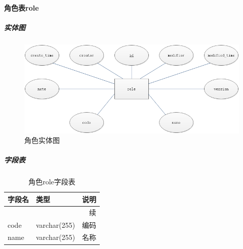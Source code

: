 \documentclass[titlepage,UTF8,linespread=1.5]{ctexart}
\begin{document}
\paragraph{角色表role}
\subparagraph{实体图}
\begin{figure}[H]
    \centering
    \includegraphics[width=140mm]{entity-role.png}
    \caption{角色实体图}
    \label{fig:entity-role}
\end{figure}
\subparagraph{字段表}
\begin{longtable}{|p{10em}|p{6em}|p{15em}|}
    \caption{角色role字段表}\label{tab:table_role}       \\\hline
    字段名         & 类型         & 说明                 \\\hline
    \endfirsthead
    \multicolumn{3}{r}{{续\tablename\thetable{}}}        \\\hline
    \endhead
    code           & varchar(255) & 编码                 \\\hline
    name           & varchar(255) & 名称                 \\\hline
\end{longtable}\par
\end{document}
